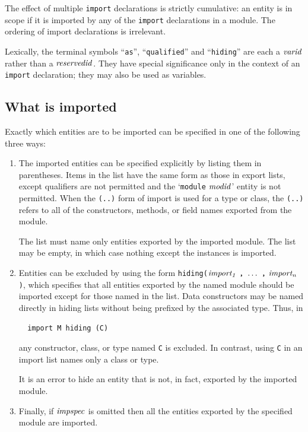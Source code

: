 The effect of multiple \mbox{\tt import} declarations is strictly
cumulative: an entity is in scope if it is imported by any of the \mbox{\tt import}
declarations in a module.  The ordering of import declarations is irrelevant.

Lexically, the terminal symbols ``\mbox{\tt as}'', ``\mbox{\tt qualified}'' and
``\mbox{\tt hiding}'' are each a \mbox{$\it varid$} rather than a \mbox{$\it reservedid$}.  They have
special significance only in the context of an \mbox{\tt import} declaration;
they may also be used as variables.

\subsection{What is imported}
\label{whatisimported}

Exactly which entities are to be imported can be specified in one
of the following three ways:\nopagebreak[4]
\begin{enumerate}
\item
The imported entities can be specified explicitly
by listing them in parentheses.
Items in the list have the same form as those in export lists, except
qualifiers are not permitted and
the `\mbox{\tt module} \mbox{$\it modid$}' entity is not permitted.  When the \mbox{\tt (..)} form
of import is used for a type or class, the \mbox{\tt (..)} refers to all of the
constructors, methods, or field names exported from the module.

The list must name only
entities exported by the imported module.
The list may be empty, in which case nothing except the instances is
imported.

\item
Entities can be excluded by 
using the form \mbox{\tt hiding(}\mbox{$\it import_1\ \makebox{\tt ,}\ \ldots \ \makebox{\tt ,}\ import_n$}
\mbox{\tt )}, which
specifies that all entities exported by the named module should
be imported except for those named in the list.  Data constructors may be
named directly in hiding lists without being prefixed by the
associated type.  Thus, in
\bprog
{\small\begin{verbatim}
  import M hiding (C)
\end{verbatim}}
\eprog
any constructor, class, or type named \mbox{\tt C} is excluded.  In contrast,
using \mbox{\tt C} in an import list names only a class or type.  

It is an error to hide an entity that is not, in fact, exported by
the imported module.

\item
Finally, if \mbox{$\it impspec$} is omitted then 
all the entities exported by the specified module are imported.
\end{enumerate}


